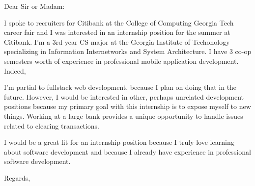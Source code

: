 \documentclass{letter}
\begin{document}
\begin{letter}{}
\opening{Dear Sir or Madam:}

I spoke to recruiters for Citibank at the College of Computing Georgia Tech career fair and I was interested in an internship position for the summer at Citibank. I'm a 3rd year CS major at the Georgia Institute of Techonology specializing in Information Internetworks and System Architecture. I have 3 co-op semesters worth of experience in professional mobile application development. Indeed, 


I'm partial to fullstack web development, because I plan on doing that in the future. However, I would be interested in other, perhaps unrelated development positions because my primary goal with this internship is to expose myself to new things. Working at a large bank provides a unique opportunity to handle issues related to clearing transactions.

I would be a great fit for an internship position because I truly love learning about software development and because I already have experience in professional software development.




\closing{Regards,}
\end{letter}
\end{document}
